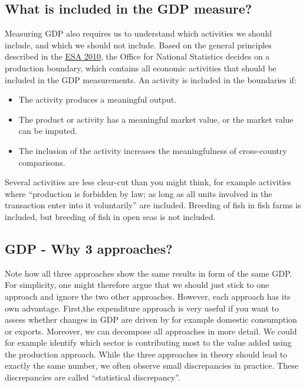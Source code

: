\documentclass[
]{book}
\providecommand{\tightlist}{%
  \setlength{\itemsep}{0pt}\setlength{\parskip}{0pt}}
\begin{document}
\hypertarget{what-is-included-in-the-gdp-measure}{%
\subsection{What is included in the GDP measure?}\label{what-is-included-in-the-gdp-measure}}

Measuring GDP also requires us to understand which activities we should include, and which we should not include. Based on the general principles described in the \href{https://unstats.un.org/unsd/nationalaccount/sna.asp}{ESA 2010}, the Office for National Statistics decides on a production boundary, which contains all economic activities that should be included in the GDP measurements. An activity is included in the boundaries if:

\begin{itemize}
\tightlist
\item
  The activity produces a meaningful output.
\item
  The product or activity has a meaningful market value, or the market value can be imputed.
\item
  The inclusion of the activity increases the meaningfulness of cross-country comparisons.
\end{itemize}

Several activities are less clear-cut than you might think, for example activities where ``production is forbidden by law; as long as all units involved in the transaction enter into it voluntarily'' are included. Breeding of fish in fish farms is included, but breeding of fish in open seas is not included.

\hypertarget{gdp---why-3-approaches}{%
\subsection{GDP - Why 3 approaches?}\label{gdp---why-3-approaches}}

Note how all three approaches show the same results in form of the same GDP. For simplicity, one might therefore argue that we should just stick to one approach and ignore the two other approaches. However, each approach has its own advantage. First,the expenditure approach is very useful if you want to assess whether changes in GDP are driven by for example domestic consumption or exports. Moreover, we can decompose all approaches in more detail. We could for example identify which sector is contributing most to the value added using the production approach. While the three approaches in theory should lead to exactly the same number, we often observe small discrepancies in practice. These discrepancies are called ``statistical discrepancy''.
\end{document}
